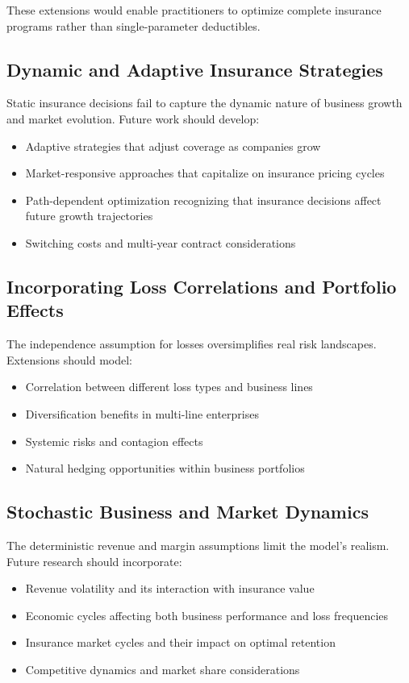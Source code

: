 \documentclass[11pt,letterpaper]{article}
\begin{document}
These extensions would enable practitioners to optimize complete insurance programs rather than single-parameter deductibles.

\subsection{Dynamic and Adaptive Insurance Strategies}

Static insurance decisions fail to capture the dynamic nature of business growth and market evolution. Future work should develop:
\begin{itemize}
    \item Adaptive strategies that adjust coverage as companies grow
    \item Market-responsive approaches that capitalize on insurance pricing cycles
    \item Path-dependent optimization recognizing that insurance decisions affect future growth trajectories
    \item Switching costs and multi-year contract considerations
\end{itemize}

\subsection{Incorporating Loss Correlations and Portfolio Effects}

The independence assumption for losses oversimplifies real risk landscapes. Extensions should model:
\begin{itemize}
    \item Correlation between different loss types and business lines
    \item Diversification benefits in multi-line enterprises
    \item Systemic risks and contagion effects
    \item Natural hedging opportunities within business portfolios
\end{itemize}

\subsection{Stochastic Business and Market Dynamics}

The deterministic revenue and margin assumptions limit the model's realism. Future research should incorporate:
\begin{itemize}
    \item Revenue volatility and its interaction with insurance value
    \item Economic cycles affecting both business performance and loss frequencies
    \item Insurance market cycles and their impact on optimal retention
    \item Competitive dynamics and market share considerations
\end{itemize}
\end{document}
